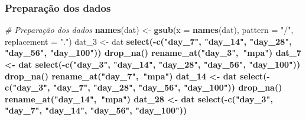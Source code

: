 \documentclass[]{article}
\newenvironment{Shaded}{\begin{snugshade}}{\end{snugshade}}
\newcommand{\CommentTok}[1]{\textcolor[rgb]{0.56,0.35,0.01}{\textit{#1}}}
\newcommand{\DataTypeTok}[1]{\textcolor[rgb]{0.13,0.29,0.53}{#1}}
\newcommand{\DecValTok}[1]{\textcolor[rgb]{0.00,0.00,0.81}{#1}}
\newcommand{\KeywordTok}[1]{\textcolor[rgb]{0.13,0.29,0.53}{\textbf{#1}}}
\newcommand{\NormalTok}[1]{#1}
\newcommand{\OperatorTok}[1]{\textcolor[rgb]{0.81,0.36,0.00}{\textbf{#1}}}
\newcommand{\StringTok}[1]{\textcolor[rgb]{0.31,0.60,0.02}{#1}}
\begin{document}
\hypertarget{preparauxe7uxe3o-dos-dados-2}{%
\subsubsection{Preparação dos
dados}\label{preparauxe7uxe3o-dos-dados-2}}

\label{show-preparation}

\begin{Shaded}
\begin{Highlighting}[]
\CommentTok{# Preparação dos dados}
\KeywordTok{names}\NormalTok{(dat) <-}\StringTok{ }\KeywordTok{gsub}\NormalTok{(}\DataTypeTok{x =} \KeywordTok{names}\NormalTok{(dat), }\DataTypeTok{pattern =} \StringTok{"/"}\NormalTok{, }\DataTypeTok{replacement =} \StringTok{"."}\NormalTok{)  }
\NormalTok{dat_}\DecValTok{3}\NormalTok{ <-}\StringTok{ }\NormalTok{dat }\OperatorTok{%
\StringTok{  }\KeywordTok{select}\NormalTok{(}\OperatorTok{-}\KeywordTok{c}\NormalTok{(}\StringTok{"day_7"}\NormalTok{, }\StringTok{"day_14"}\NormalTok{, }\StringTok{"day_28"}\NormalTok{, }\StringTok{"day_56"}\NormalTok{, }\StringTok{"day_100"}\NormalTok{)) }\OperatorTok{%
\StringTok{  }\KeywordTok{drop_na}\NormalTok{() }\OperatorTok{%
\StringTok{  }\KeywordTok{rename_at}\NormalTok{(}\StringTok{"day_3"}\NormalTok{,}\OperatorTok{~}\StringTok{"mpa"}\NormalTok{)}
\NormalTok{dat_}\DecValTok{7}\NormalTok{ <-}\StringTok{ }\NormalTok{dat }\OperatorTok{%
\StringTok{  }\KeywordTok{select}\NormalTok{(}\OperatorTok{-}\KeywordTok{c}\NormalTok{(}\StringTok{"day_3"}\NormalTok{, }\StringTok{"day_14"}\NormalTok{, }\StringTok{"day_28"}\NormalTok{, }\StringTok{"day_56"}\NormalTok{, }\StringTok{"day_100"}\NormalTok{)) }\OperatorTok{%
\StringTok{  }\KeywordTok{drop_na}\NormalTok{() }\OperatorTok{%
\StringTok{  }\KeywordTok{rename_at}\NormalTok{(}\StringTok{"day_7"}\NormalTok{,}\OperatorTok{~}\StringTok{"mpa"}\NormalTok{)}
\NormalTok{dat_}\DecValTok{14}\NormalTok{ <-}\StringTok{ }\NormalTok{dat }\OperatorTok{%
\StringTok{  }\KeywordTok{select}\NormalTok{(}\OperatorTok{-}\KeywordTok{c}\NormalTok{(}\StringTok{"day_3"}\NormalTok{, }\StringTok{"day_7"}\NormalTok{, }\StringTok{"day_28"}\NormalTok{, }\StringTok{"day_56"}\NormalTok{, }\StringTok{"day_100"}\NormalTok{)) }\OperatorTok{%
\StringTok{  }\KeywordTok{drop_na}\NormalTok{() }\OperatorTok{%
\StringTok{  }\KeywordTok{rename_at}\NormalTok{(}\StringTok{"day_14"}\NormalTok{,}\OperatorTok{~}\StringTok{"mpa"}\NormalTok{)}
\NormalTok{dat_}\DecValTok{28}\NormalTok{ <-}\StringTok{ }\NormalTok{dat }\OperatorTok{%
\StringTok{  }\KeywordTok{select}\NormalTok{(}\OperatorTok{-}\KeywordTok{c}\NormalTok{(}\StringTok{"day_3"}\NormalTok{, }\StringTok{"day_7"}\NormalTok{, }\StringTok{"day_14"}\NormalTok{, }\StringTok{"day_56"}\NormalTok{, }\StringTok{"day_100"}\NormalTok{)) }\OperatorTok{%
}}}}}}}}}}}
\end{Highlighting}
\end{Shaded}
\end{document}
